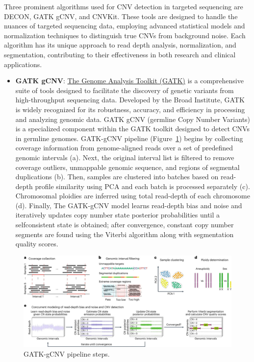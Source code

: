 \documentclass[a4paper,12pt,twoside]{ThesisStyle}
\begin{document}
Three prominent algorithms used for CNV detection in targeted sequencing are DECON, GATK gCNV, and CNVKit. These tools are designed to handle the nuances of targeted sequencing data, employing advanced statistical models and normalization techniques to distinguish true CNVs from background noise. Each algorithm has its unique approach to read depth analysis, normalization, and segmentation, contributing to their effectiveness in both research and clinical applications.
\begin{itemize}

    \item \textbf{GATK gCNV}: \href{https://github.com/broadinstitute/gatk}{The Genome Analysis Toolkit (GATK)} is a comprehensive suite of tools designed to facilitate the discovery of genetic variants from high-throughput sequencing data. Developed by the Broad Institute, GATK is widely recognized for its robustness, accuracy, and efficiency in processing and analyzing genomic data. GATK gCNV (germline Copy Number Variants) is a specialized component within the GATK toolkit designed to detect CNVs in germline genomes. GATK-gCNV pipeline (Figure~\ref{fig:gatk-gcnv}) begins by collecting coverage information from genome-aligned reads over a set of predefined genomic intervals (a). Next, the original interval list is filtered to remove coverage outliers, unmappable genomic sequence, and regions of segmental duplications (b). Then, samples are clustered into batches based on read-depth profile similarity using PCA and each batch is processed separately (c).  Chromosomal ploidies are inferred using total read-depth of each chromosome (d). Finally, The GATK-gCNV model learns read-depth bias and noise
and iteratively updates copy number state posterior probabilities until a selfconsistent state is obtained; after convergence, constant copy number segments are found using the Viterbi algorithm along with segmentation quality scores.
    \end{itemize}
    \begin{figure}[htb]
\includegraphics[width=13 cm]{imatges/gatk-gcnv.jpg}
\caption{\label{fig:gatk-gcnv} GATK-gCNV pipeline steps.}
\end{figure}
\end{document}
